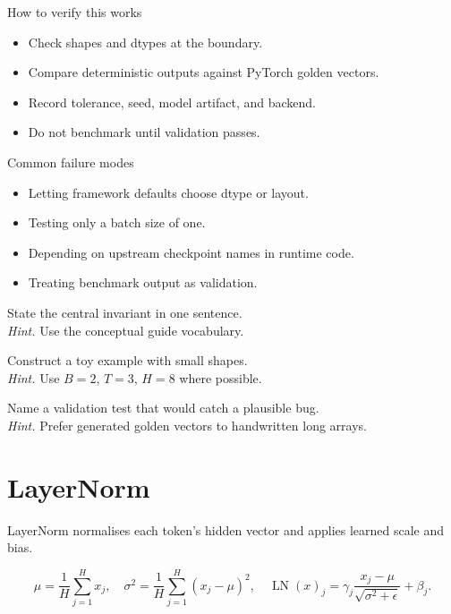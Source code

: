 \begin{verificationbox}{How to verify this works}
\begin{itemize}
\item Check shapes and dtypes at the boundary.
\item Compare deterministic outputs against PyTorch golden vectors.
\item Record tolerance, seed, model artifact, and backend.
\item Do not benchmark until validation passes.
\end{itemize}
\end{verificationbox}

\begin{warningbox}{Common failure modes}
\begin{itemize}
\item Letting framework defaults choose dtype or layout.
\item Testing only a batch size of one.
\item Depending on upstream checkpoint names in runtime code.
\item Treating benchmark output as validation.
\end{itemize}
\end{warningbox}

\begin{chapterexercises}
\item State the central invariant in one sentence.\\
\textit{Hint.} Use the conceptual guide vocabulary.
\item Construct a toy example with small shapes.\\
\textit{Hint.} Use $B=2$, $T=3$, $H=8$ where possible.
\item Name a validation test that would catch a plausible bug.\\
\textit{Hint.} Prefer generated golden vectors to handwritten long arrays.
\end{chapterexercises}

\chapter{LayerNorm}
\label{ch:layernorm}
LayerNorm normalises each token's hidden vector and applies learned scale and bias.

\[
\mu=\frac{1}{H}\sum_{j=1}^{H}x_j,\quad
\sigma^2=\frac{1}{H}\sum_{j=1}^{H}(x_j-\mu)^2,\quad
\operatorname{LN}(x)_j=\gamma_j\frac{x_j-\mu}{\sqrt{\sigma^2+\epsilon}}+\beta_j.
\]

